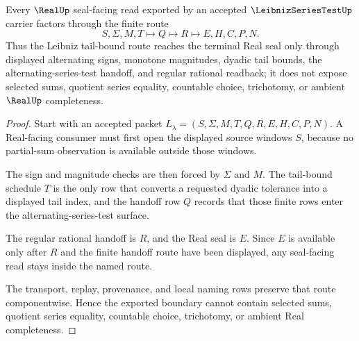 \begin{theorem}
\label{thm:leibniz-series-test-real-seal-nonescape}
Every $\RealUp$ seal-facing read exported by an accepted $\LeibnizSeriesTestUp$ carrier factors through the finite route
$$
S,\Sigma,M,T \longmapsto Q \longmapsto R \longmapsto E,H,C,P,N .
$$
Thus the Leibniz tail-bound route reaches the terminal Real seal only through displayed alternating signs, monotone magnitudes, dyadic tail bounds, the alternating-series-test handoff, and regular rational readback; it does not expose selected sums, quotient series equality, countable choice, trichotomy, or ambient $\RealUp$ completeness.
\end{theorem}
\begin{proof}
Start with an accepted packet $L_{\lambda}=(S,\Sigma,M,T,Q,R,E,H,C,P,N)$. A Real-facing consumer must first open the displayed source windows $S$, because no partial-sum observation is available outside those windows.

The sign and magnitude checks are then forced by $\Sigma$ and $M$. The tail-bound schedule $T$ is the only row that converts a requested dyadic tolerance into a displayed tail index, and the handoff row $Q$ records that those finite rows enter the alternating-series-test surface.

The regular rational handoff is $R$, and the Real seal is $E$. Since $E$ is available only after $R$ and the finite handoff route have been displayed, any seal-facing read stays inside the named route.

The transport, replay, provenance, and local naming rows preserve that route componentwise. Hence the exported boundary cannot contain selected sums, quotient series equality, countable choice, trichotomy, or ambient Real completeness.
\end{proof}


\begin{closurestatus}{\LeibnizSeriesTestUp}
  \theoryclosure{\seedClosure}
  \formalstatus{\unformalizedV}
\end{closurestatus}
